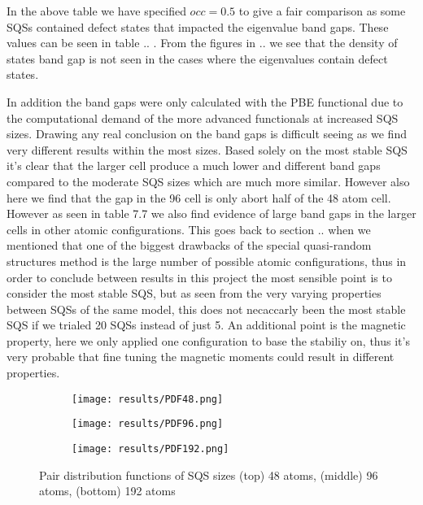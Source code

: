In the above table we have specified $occ = 0.5$ to give a fair comparison as some SQSs contained defect states that impacted the eigenvalue band gaps. These values can be seen in table .. . From the figures in .. we see that the density of states band gap is not seen in the cases where the eigenvalues contain defect states. 

In addition the band gaps were only calculated with the PBE functional due to the computational demand of the more advanced functionals at increased SQS sizes. Drawing any real conclusion on the band gaps is difficult seeing as we find very different results within the most sizes. Based solely on the most stable SQS it's clear that the larger cell produce a much lower and different band gaps compared to the moderate SQS sizes which are much more similar. However also here we find that the gap in the 96 cell is only abort half of the 48 atom cell. However as seen in table 7.7 we also find evidence of large band gaps in the larger cells in other atomic configurations. This goes back to section .. when we mentioned that one of the biggest drawbacks of the special quasi-random structures method is the large number of possible atomic configurations, thus in order to conclude between results in this project the most sensible point is to consider the most stable SQS, but as seen from the very varying properties between SQSs of the same model, this does not necaccarly been the most stable SQS if we trialed 20 SQSs instead of just 5. An additional point is the magnetic property, here we only applied one configuration to base the stabiliy on, thus it's very probable that fine tuning the magnetic moments could result in different properties.  

\begin{figure}[H]
\begin{subfigure}{\textwidth}
\texttt{[image: results/PDF48.png]}
\end{subfigure}
\begin{subfigure}{\textwidth}
\texttt{[image: results/PDF96.png]}
\end{subfigure}
\begin{subfigure}{\textwidth}
\texttt{[image: results/PDF192.png]}
\end{subfigure}
\caption{Pair distribution functions of SQS sizes (top) 48 atoms, (middle) 96 atoms, (bottom) 192 atoms}
\end{figure}

